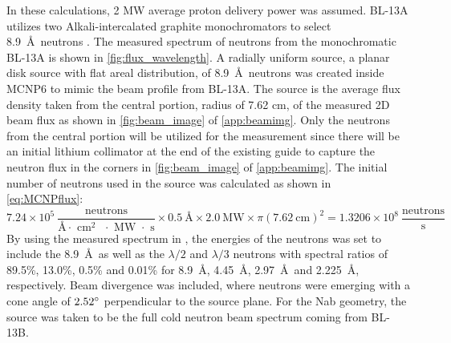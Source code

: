 In these calculations, 2 MW average proton delivery power was assumed. BL-13A utilizes two Alkali-intercalated graphite monochromators to select 8.9~\AA\ neutrons \cite{Fomin2015}. The measured spectrum of neutrons from the monochromatic BL-13A is shown in \cref{fig:flux_wavelength}. A radially uniform source, a planar disk source with flat areal distribution, of 8.9~\AA\ neutrons was created inside MCNP6 to mimic the beam profile from BL-13A. The source is the average flux density taken from the central portion, radius of 7.62 cm, of the measured 2D beam flux as shown in \cref{fig:beam_image} of \cref{app:beamimg}. Only the neutrons from the central portion will be utilized for the measurement since there will be an initial lithium collimator at the end of the existing guide to capture the neutron flux in the corners in \cref{fig:beam_image} of \cref{app:beamimg}. The initial number of neutrons used in the source was calculated as shown in \cref{eq:MCNPflux}:
\begin{equation}
    7.24\times10^{5}~ \frac{\text{neutrons}}{\text{\AA $\cdot$ cm$^{2}$ $\cdot$ MW $\cdot$ s}} \times 0.5 ~\text{\AA} \times 2.0 ~\text{MW} \times \pi(7.62 ~\text{cm})^{2} = 1.3206\times10^{8} ~\frac{\text{neutrons}}{\text{s}}
    \label{eq:MCNPflux}
\end{equation}
By using the measured spectrum in \cite{Fomin2015}, the energies of the neutrons was set to include the 8.9~\AA\ as well as the $\lambda/2$ and $\lambda/3$ neutrons with spectral ratios of 89.5\%, 13.0\%, 0.5\% and 0.01\% for 8.9~\AA, 4.45~\AA, 2.97~\AA\ and 2.225~\AA, respectively. Beam divergence was included, where neutrons were emerging with a cone angle of $2.52\degree$ perpendicular to the source plane. For the Nab geometry, the source was taken to be the full cold neutron beam spectrum coming from BL-13B. 


